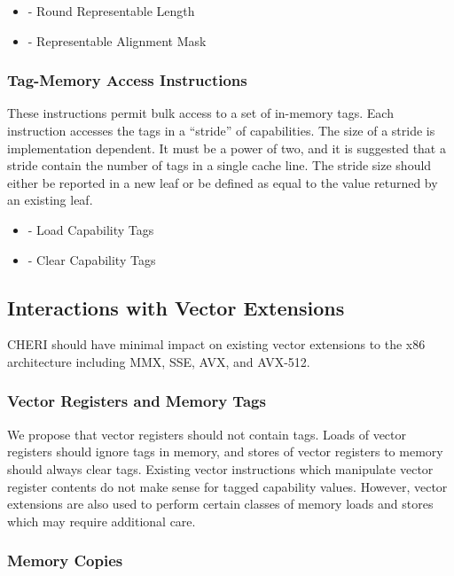 \begin{itemize}
  \item {} - Round Representable Length
  \item {} - Representable Alignment Mask
\end{itemize}

\subsubsection{Tag-Memory Access Instructions}

These instructions permit bulk access to a set of in-memory tags.
Each instruction accesses the tags in a ``stride'' of capabilities.
The size of a stride is implementation dependent.  It must be a power
of two, and it is suggested that a stride contain the number of tags
in a single cache line.  The stride size should either be reported in
a new  leaf or be defined as equal to the value
returned by an existing  leaf.

\begin{itemize}
  \item {} - Load Capability Tags
  \item {} - Clear Capability Tags
\end{itemize}

\subsection{Interactions with Vector Extensions}

CHERI should have minimal impact on existing vector extensions to the
x86 architecture including MMX, SSE, AVX, and AVX-512.

\subsubsection{Vector Registers and Memory Tags}

We propose that vector registers should not contain tags.  Loads of
vector registers should ignore tags in memory, and stores of vector
registers to memory should always clear tags.  Existing vector
instructions which manipulate vector register contents do not make
sense for tagged capability values.  However, vector extensions are
also used to perform certain classes of memory loads and stores which
may require additional care.

\subsubsection{Memory Copies}

